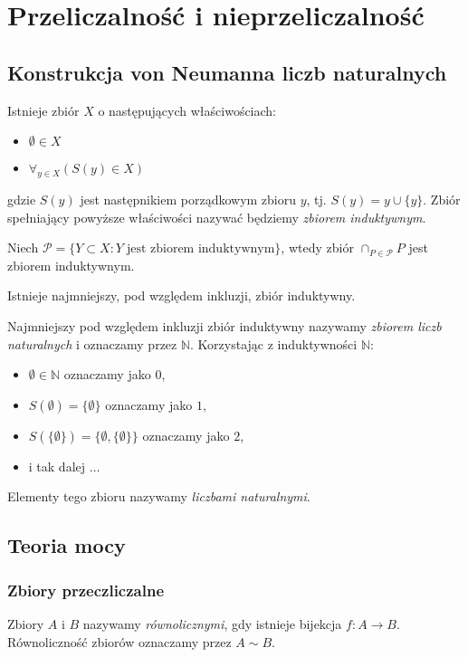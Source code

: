 \chapter{Przeliczalność i nieprzeliczalność}
\section{Konstrukcja von Neumanna liczb naturalnych}
	\begin{axm}
		Istnieje zbiór $X$ o następujących właściwościach:
		\begin{itemize}
			\item $\emptyset \in X$
			\item $\forall_{y \in X} \left( S(y) \in X\right)$
		\end{itemize}
		gdzie $S(y)$ jest następnikiem porządkowym zbioru $y$, tj. $S(y) = y \cup \{y\}$. Zbiór spełniający powyższe właściwości nazywać będziemy \textit{zbiorem induktywnym}.
	\end{axm}
	\begin{lem}
		Niech $\mathcal{P} = \{ Y \subset X : Y \; \text{jest zbiorem induktywnym}\}$, wtedy zbiór
		$\cap_{P \in \mathcal{P}} P$ jest zbiorem induktywnym.
	\end{lem}
	\begin{tw}
		Istnieje najmniejszy, pod względem inkluzji, zbiór induktywny.
	\end{tw}
	\begin{df}
		Najmniejszy pod względem inkluzji zbiór induktywny nazywamy \textit{zbiorem liczb naturalnych} i oznaczamy przez $\mathbb{N}$.
		Korzystając z induktywności $\mathbb{N}$:
		\begin{itemize}
			\item $\emptyset \in \mathbb{N}$ oznaczamy jako $0$,
			\item $S(\emptyset) = \{\emptyset\}$ oznaczamy jako $1$,
			\item $S(\{\emptyset\}) = \{\emptyset, \{\emptyset\} \}$ oznaczamy jako $2$,
			\item i tak dalej $\ldots$
		\end{itemize}
		Elementy tego zbioru nazywamy \textit{liczbami naturalnymi}.
	\end{df}

	\section{Teoria mocy}
	\subsection{Zbiory przeczliczalne}
	\begin{df}
		Zbiory $A$ i $B$ nazywamy \textit{równolicznymi}, gdy istnieje bijekcja $f:A\rightarrow B$. Równoliczność zbiorów oznaczamy przez $A \sim B$.
	\end{df}
	
